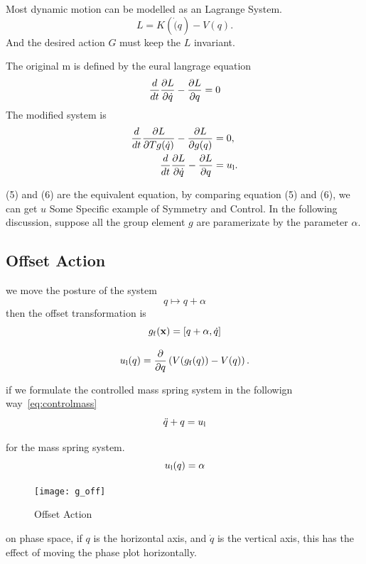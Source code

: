 Most dynamic motion can be modelled as an Lagrange System. 
\[
L=K(\dot(q)-V(q).
\]
And the desired action $G$ must keep the $L$ invariant. 

The original m is defined by the eural langrage equation
\begin{equation}
\frac{d}{dt} \frac{\partial L}{\partial \dot{q}} - \frac{\partial L}{\partial q} = 0
\label{eq:uncontrolled_euler_lagrange}
\end{equation}
The modified system is 
\begin{align}
\frac{d}{dt} \frac{\partial L}{\partial Tg(\dot{q})} - \frac{\partial L}{\partial g(q)}&=0,\label{eq:liegroup_euler_lagrange}\\
\frac{d}{dt} \frac{\partial L}{\partial \dot{q}} - \frac{\partial L}{\partial q}&=u_{\mathrm{l}}. \label{eq:controlled_euler_lagrange}
\end{align}


(5) and (6) are the equivalent equation, by comparing  equation (5) and (6), we can get $u$
Some Specific example of Symmetry and Control.
In the following discussion, suppose all the group element $g$ are paramerizate by the parameter $\alpha$.

\subsection*{ Offset Action}
we move the posture of the system 
\[
q \mapsto q+\alpha
\]
then the offset transformation is
\[
g_{\mathrm{f}}(\mathbf{x}) = [q+\alpha,\dot{q}]
\]


\begin{equation}
u_{\mathrm{l}}(q) = \frac{\partial}{\partial q} \left(V(g_{\mathrm{f}}(q)) - V(q)\right).
\end{equation}

if we formulate the controlled mass spring system in the followign way~\ref{eq:controlmass}
\begin{equation}
\label{eq:controlmass}
\ddot{q}+q=u_{\mathrm{l}}
\end{equation}

for the mass spring system.
\[
u_{\mathrm{l}}(q)=\alpha
\]

\begin{figure}[!htbp]
  \begin{center}
      \texttt{[image: g\_off]}
    \caption{Offset Action}
    \label{fig:goff}
\end{center}
\end{figure}
on phase space, if $q$ is the horizontal axis, and $\dot{q}$ is the vertical axis, this has the effect of moving the phase plot horizontally.

